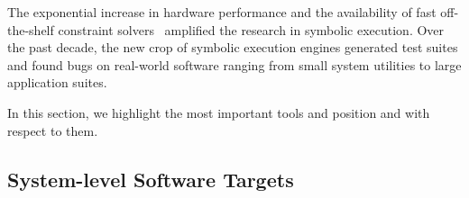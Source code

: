 The exponential increase in hardware performance and the availability of fast off-the-shelf constraint solvers~\cite{chaff,minisat,stp,Z3,cvc} amplified the research in symbolic execution.  Over the past decade, the new crop of symbolic execution engines generated test suites and found bugs on real-world software ranging from small system utilities to large application suites.

In this section, we highlight the most important tools and position \cnine and \chef with respect to them.

\subsection{System-level Software Targets}





